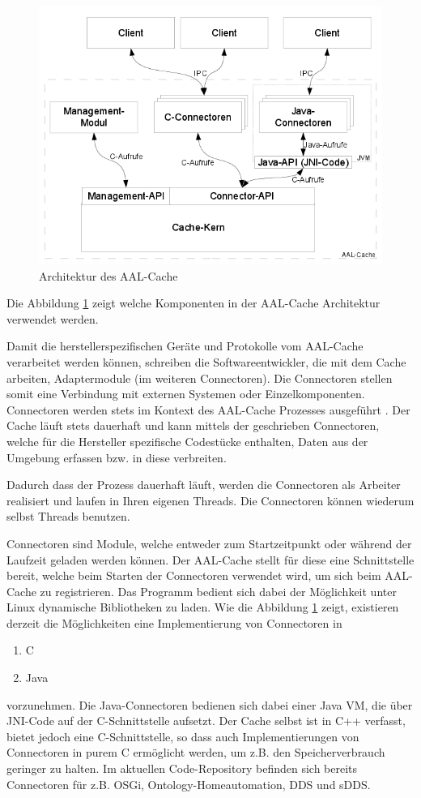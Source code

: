 \begin{figure}[h]
\includegraphics[scale=0.7]{images/aalcache}
\caption{Architektur des AAL-Cache}
\label{abb_aalcache}
\end{figure}

Die Abbildung \ref{abb_aalcache} zeigt welche Komponenten in der AAL-Cache Architektur verwendet werden.

Damit die herstellerspezifischen Geräte und Protokolle vom AAL-Cache verarbeitet werden können, schreiben
die Softwareentwickler, die mit dem Cache arbeiten, Adaptermodule (im weiteren Connectoren).
Die Connectoren stellen somit eine Verbindung mit externen Systemen oder Einzelkomponenten.
Connectoren werden stets im Kontext des AAL-Cache Prozesses ausgeführt \cite{aalcache_online}.
Der Cache läuft stets dauerhaft und kann mittels der geschrieben Connectoren, welche
für die Hersteller spezifische Codestücke enthalten, Daten aus der Umgebung erfassen bzw. in diese verbreiten.

Dadurch dass der Prozess dauerhaft läuft, werden die Connectoren als Arbeiter realisiert und laufen in
Ihren eigenen Threads.
Die Connectoren können wiederum selbst Threads benutzen.

Connectoren sind Module, welche entweder zum Startzeitpunkt oder während der Laufzeit geladen werden
können.
Der AAL-Cache stellt für diese eine Schnittstelle bereit, welche beim Starten der Connectoren
verwendet wird, um sich beim AAL-Cache zu registrieren.
Das Programm bedient sich dabei der Möglichkeit unter Linux dynamische Bibliotheken zu laden.
Wie die Abbildung \ref{abb_aalcache} zeigt, existieren derzeit die Möglichkeiten eine Implementierung
von Connectoren in
\begin{enumerate}
\item C
\item Java
\end{enumerate}
vorzunehmen.
Die Java-Connectoren bedienen sich dabei einer Java VM, die über JNI-Code auf der C-Schnittstelle aufsetzt.
Der Cache selbst ist in C++ verfasst, bietet jedoch eine C-Schnittstelle, so dass auch Implementierungen von
Connectoren in purem C ermöglicht werden, um z.B. den Speicherverbrauch geringer zu halten.
Im aktuellen Code-Repository \cite{aalcache_code} befinden sich bereits Connectoren für z.B. OSGi,
Ontology-Homeautomation, DDS und sDDS.


